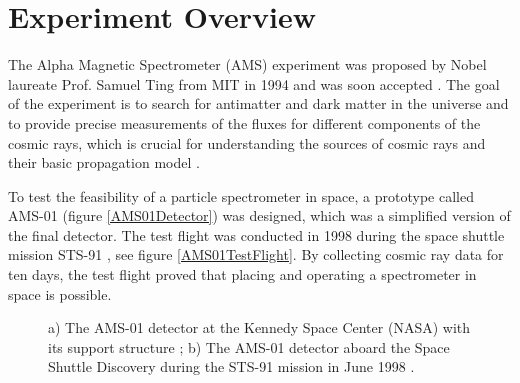 
\section{Experiment Overview}

The Alpha Magnetic Spectrometer (AMS) experiment was proposed by Nobel laureate Prof. Samuel Ting from MIT in 1994 and was soon accepted \cite{AMSProposal1994}. The goal of the experiment is to search for antimatter and dark matter in the universe
and to provide precise measurements of the fluxes for different components of the cosmic rays, which is crucial for understanding the sources of cosmic rays and their basic propagation model \cite{AMS02Goal}. \par

To test the feasibility of a particle spectrometer in space, a prototype called AMS-01 (figure \ref{AMS01Detector}) was designed, which was a simplified version of the final detector. The test flight was conducted in 1998 during the space shuttle mission STS-91 \cite{AMS01Result}, see figure \ref{AMS01TestFlight}. By collecting cosmic ray data for ten days, the test flight proved that placing and operating a spectrometer in space is possible.   \par
    
\begin{figure}[] 
\centering   
{}    
\caption[The AMS-01 detector.]{a) The AMS-01 detector at the Kennedy Space Center (NASA) with its support structure \cite{AMS01Brochure}; b) The AMS-01 detector aboard the Space Shuttle Discovery during the STS-91 mission in June 1998 \cite{WikiAMS01Flight}.}   
    
\label{AMS01}    
\end{figure}

